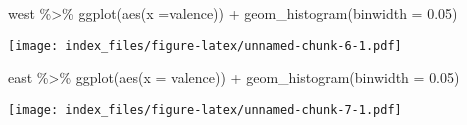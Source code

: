 \documentclass[
]{article}
\newenvironment{Shaded}{\begin{snugshade}}{\end{snugshade}}
\newcommand{\AttributeTok}[1]{\textcolor[rgb]{0.77,0.63,0.00}{#1}}
\newcommand{\FloatTok}[1]{\textcolor[rgb]{0.00,0.00,0.81}{#1}}
\newcommand{\FunctionTok}[1]{\textcolor[rgb]{0.00,0.00,0.00}{#1}}
\newcommand{\NormalTok}[1]{#1}
\newcommand{\SpecialCharTok}[1]{\textcolor[rgb]{0.00,0.00,0.00}{#1}}
\begin{document}
\begin{Shaded}
\begin{Highlighting}[]
\NormalTok{west }\SpecialCharTok{\%\textgreater{}\%} \FunctionTok{ggplot}\NormalTok{(}\FunctionTok{aes}\NormalTok{(}\AttributeTok{x =}\NormalTok{valence)) }\SpecialCharTok{+} \FunctionTok{geom\_histogram}\NormalTok{(}\AttributeTok{binwidth =} \FloatTok{0.05}\NormalTok{)}
\end{Highlighting}
\end{Shaded}

\texttt{[image: index\_files/figure-latex/unnamed-chunk-6-1.pdf]}

\begin{Shaded}
\begin{Highlighting}[]
\NormalTok{east }\SpecialCharTok{\%\textgreater{}\%} \FunctionTok{ggplot}\NormalTok{(}\FunctionTok{aes}\NormalTok{(}\AttributeTok{x =}\NormalTok{ valence)) }\SpecialCharTok{+} \FunctionTok{geom\_histogram}\NormalTok{(}\AttributeTok{binwidth =} \FloatTok{0.05}\NormalTok{)}
\end{Highlighting}
\end{Shaded}

\texttt{[image: index\_files/figure-latex/unnamed-chunk-7-1.pdf]}
\end{document}
